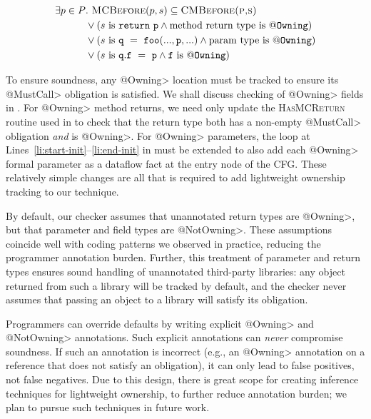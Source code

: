 \begin{align*}
  \exists p \in P &.\ \textsc{MCBefore}(p,s) \subseteq \textsc{CMBefore(p,s)}\\
                  &\vee (s \mathrm{\ is\ } \mathtt{return\ p} \wedge \mathrm{method\ return\ type\ is\ } \mathtt{@Owning})\\
                  &\vee (s \mathrm{\ is\ } \mathtt{q\ =\ foo(...,p,...)} \wedge \mathrm{param\ type\ is\ } \mathtt{@Owning})\\
                  &\vee (s \mathrm{\ is\ } \mathtt{q.f\ =\ p} \wedge \mathtt{f} \mathrm{\ is\ } \mathtt{@Owning})\\
\end{align*}

To ensure soundness, any \<@Owning> location must be tracked to ensure its
\<@MustCall> obligation is satisfied.  We shall discuss checking of \<@Owning>
fields in .  For \<@Owning> method returns, we need only
update the \textsc{HasMCReturn} routine used in  to check that
the return type both has a non-empty \<@MustCall> obligation \emph{and} is
\<@Owning>.  For \<@Owning> parameters, the loop at
Lines~\ref{li:start-init}--\ref{li:end-init} in 
must be extended to also add each \<@Owning> formal parameter as a dataflow
fact at the entry node of the CFG.  These relatively simple changes are all that
is required to add lightweight ownership tracking to our technique.

By default, our checker assumes that unannotated return types are \<@Owning>,
but that parameter and field types are \<@NotOwning>.  These assumptions
coincide well with coding patterns we observed in practice, reducing the
programmer annotation burden.  Further, this treatment of parameter and return
types ensures sound handling of unannotated third-party libraries: any object
returned from such a library will be tracked by default, and the checker never
assumes that passing an object to a library will satisfy its obligation.

Programmers can override defaults by writing explicit \<@Owning> and
\<@NotOwning> annotations.  Such explicit annotations can \emph{never}
compromise soundness.  If such an annotation is incorrect (e.g., an \<@Owning>
annotation on a reference that does not satisfy an obligation), it can only lead
to false positives, not false negatives.  Due to this design, there is great
scope for creating inference techniques for lightweight ownership, to further
reduce annotation burden; we plan to pursue such techniques in future work.

